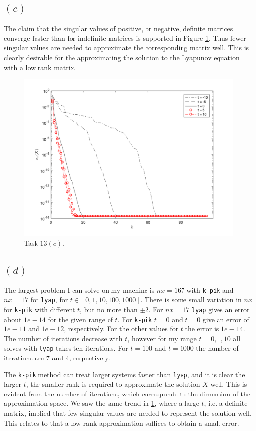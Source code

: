 \subsection*{$(c)$}
The claim that the singular values of positive, or negative, definite matrices converge faster than for indefinite matrices is supported in Figure \ref{13c}. Thus fewer singular values are needed to approximate the corresponding matrix well. This is clearly desirable for the approximating the solution to the Lyapunov equation with a low rank matrix.
\begin{figure}[h!]
\centering
\includegraphics[scale=0.5]{task13c.png}
\caption{Task $13(c)$. }
\label{13c}
\end{figure}




\subsection*{$(d)$}
The largest problem I can solve on my machine is $nx = 167$ with \texttt{k-pik} and $nx = 17$ for \texttt{lyap}, for $t\in[0,1,10,100,1000]$. There is some small variation in $nx$ for \texttt{k-pik} with different $t$, but no more than $\pm 2$. For $nx = 17$  \texttt{lyap} gives an error about $1e-14$ for the given range of $t$. For \texttt{k-pik} $t=0$ and $t = 0$ give an error of $1e-11$ and $1e-12$, respectively. For the other values for $t$ the error is $1e-14$. The number of iterations decrease with $t$, however for my range $t = 0,1,10$ all solves with \texttt{lyap} takes ten iterations. For $t = 100$ and $t = 1000$ the number of iterations are $7$ and $4$, respectively.

The \texttt{k-pik} method can treat larger systems faster than \texttt{lyap}, and it is clear the  larger $t$, the smaller rank is required to approximate the  solution $X$ well. This is evident from the number of iterations, which corresponds to the dimension of the approximation space. We saw the same trend in \ref{13c}, where a large $t$, i.e. a definite matrix, implied that few singular values are needed to represent the solution well. This relates to that a low rank approximation suffices to obtain a small error.
